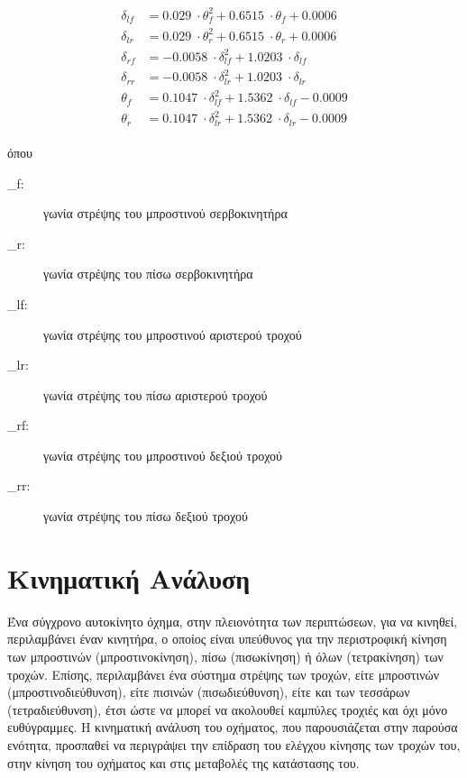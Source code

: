 \begin{align}
\begin{split}
\delta_{lf} &= 0.029\;\cdot \theta_{f}^2 + 0.6515\;\cdot \theta_{f} + 0.0006\\
\delta_{lr} &= 0.029\;\cdot \theta_{r}^2 + 0.6515\;\cdot \theta_{r} + 0.0006\\
\delta_{rf} &= -0.0058\;\cdot \delta_{lf}^2 + 1.0203\;\cdot \delta_{lf}\\
\delta_{rr} &= -0.0058\;\cdot \delta_{lr}^2 + 1.0203\;\cdot \delta_{lr}\\
\theta_{f}\, &= 0.1047\;\cdot \delta_{lf}^2 + 1.5362\;\cdot \delta_{lf} - 0.0009\\
\theta_{r}\, &= 0.1047\;\cdot \delta_{lr}^2 + 1.5362\;\cdot \delta_{lr} - 0.0009
\end{split}
\label{eq:polynoms}
\end{align}

\bigskip
\noindent
όπου

\begin{description}
	\item[\theta_{f}:] γωνία στρέψης του μπροστινού σερβοκινητήρα
	\item[\theta_{r}:] γωνία στρέψης του πίσω σερβοκινητήρα
	\item[\delta_{lf}:] γωνία στρέψης του μπροστινού αριστερού τροχού
	\item[\delta_{lr}:] γωνία στρέψης του πίσω αριστερού τροχού
	\item[\delta_{rf}:] γωνία στρέψης του μπροστινού δεξιού τροχού
	\item[\delta_{rr}:] γωνία στρέψης του πίσω δεξιού τροχού
\end{description}


\bigskip
\section{Κινηματική Ανάλυση} \label{sec:kinematic_analysis}
Ένα σύγχρονο αυτοκίνητο όχημα, στην πλειονότητα των περιπτώσεων, για να κινηθεί, περιλαμβάνει έναν κινητήρα, ο οποίος είναι υπεύθυνος για την περιστροφική κίνηση των μπροστινών (μπροστινοκίνηση), πίσω (πισωκίνηση) ή όλων (τετρακίνηση) των τροχών. Επίσης, περιλαμβάνει ένα σύστημα στρέψης των τροχών, είτε μπροστινών (μπροστινοδιεύθυνση), είτε πισινών (πισωδιεύθυνση), είτε και των τεσσάρων (τετραδιεύθυνση), έτσι ώστε να μπορεί να ακολουθεί καμπύλες τροχιές και όχι μόνο ευθύγραμμες. Η κινηματική ανάλυση του οχήματος, που παρουσιάζεται στην παρούσα ενότητα, προσπαθεί να περιγράψει την επίδραση του ελέγχου κίνησης των τροχών του, στην κίνηση του οχήματος και στις μεταβολές της {κατάστασης} του.

